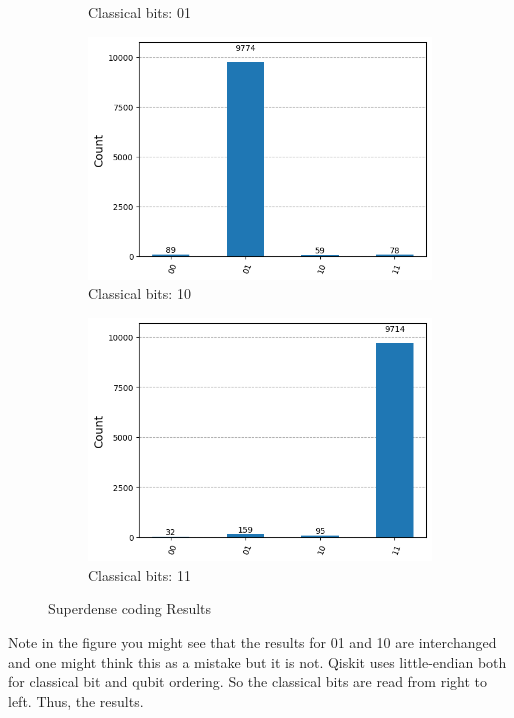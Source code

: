 \documentclass[12pt, oneside]{book}
\theoremstyle{definition}
\theoremstyle{definition}
\theoremstyle{remark}
\begin{document}
\begin{enumerate}
\begin{figure}
\begin{subfigure}[b]{0.45\linewidth}
        \caption{Classical bits: 01}
        \label{fig:results_superdense_01}
        \end{subfigure}
        \vspace{0.5 cm}
        \begin{subfigure}[b]{0.45\linewidth}
        \centering
        \includegraphics[width=1\linewidth]{../images/results_superdense_10.png}
        \caption{Classical bits: 10}
        \label{fig:rsults_superdense_10}
        \end{subfigure}
        \hfill
        \begin{subfigure}[b]{0.45\textwidth}
        \centering
        \includegraphics[width=1\linewidth]{../images/results_superdense_11.png}
        \caption{Classical bits: 11}
        \label{fig:results_superdense_11}
        \end{subfigure}    
        \caption{Superdense coding Results}
        \label{fig:superdense_results}
    \end{figure}
    Note in the figure you might see that the results for 01 and 10 are interchanged and one might think this as a mistake but it is not. Qiskit uses little-endian both for classical bit and qubit ordering. So the classical bits are read from right to left. Thus, the results.
\end{enumerate}
\end{document}
